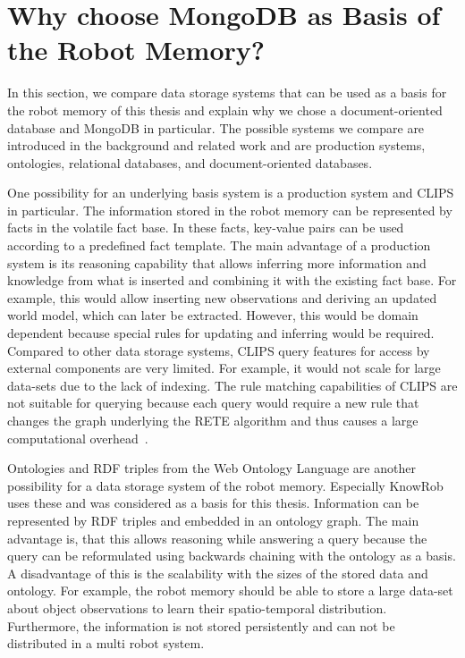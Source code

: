 \section{Why choose MongoDB as Basis of the Robot Memory?}
\label{sec:basis-representation}
In this section, we compare data storage systems that can be used as a
basis for the robot memory of this thesis and explain why we chose a
document-oriented database and MongoDB in particular. The possible
systems we compare are introduced in
the background and related work and are production systems,
ontologies, relational databases, and document-oriented databases.

One possibility for an underlying basis system is a production system
and CLIPS in particular. The information stored in the robot memory
can be represented by facts in the volatile fact base. In these facts,
key-value pairs can be used according to a predefined fact
template. The main advantage of a production system is its reasoning
capability that allows inferring more information and knowledge from
what is inserted and combining it with the existing fact base. For
example, this would allow inserting new observations and deriving an
updated world model, which can later be extracted. However,
this would be domain dependent because special rules for updating and inferring
would be required. Compared to other data storage systems,
CLIPS query features for access by external components are very
limited. For example, it would not scale for large data-sets due to the
lack of indexing. The rule matching capabilities of CLIPS are not
suitable for querying because each query would require a new rule that
changes the graph underlying the RETE algorithm and thus causes a
large computational overhead~\cite{Rete}.

Ontologies and RDF triples from the Web Ontology Language are another
possibility for a data storage system of the robot memory. Especially
KnowRob uses these and was considered as a basis for this
thesis. Information can be represented by RDF triples and embedded in
an ontology graph. The main advantage is, that this allows reasoning
while answering a query because the query can be reformulated using
backwards chaining with the ontology as a basis. A disadvantage of this is
the scalability with the sizes of the stored data and ontology. For
example, the robot memory should be able to store a large data-set
about object observations to learn their spatio-temporal
distribution. Furthermore, the information is not stored persistently
and can not be distributed in a multi robot system.

